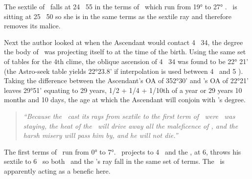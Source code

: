 The sextile of \Mars\, falls at 24 \Pisces\, 55 in the terms of \Mars\, which run from 19° to 27° \Pisces. \Venus\, is sitting at 25 \Pisces\, 50 so she is in the same terms as the sextile ray and therefore removes its malice.

Next the author looked at when the Ascendant would contact 4 \Taurus\, 34, the degree the body of \Saturn\, was projecting itself to at the time of the birth. Using the same set of tables for the 4th clime, the oblique ascension of 4 \Taurus\, 34 was found to be 22° 21' (the Astro-seek table yields 22°23.8' if interpolation is used between 4 \Taurus\, and 5 \Taurus). Taking the difference between the Ascendant's OA of 352°30' and \Saturn's OA of 22°21' leaves 29°51' equating to 29 years, 1/2 + 1/4 + 1/10th of a year or 29 years 10 months and 10 days, the age at which the Ascendant will conjoin with \Saturn's degree.

\begin{quote}
\textsl{``Because  the \Sun\, cast its rays from sextile to the first term of \Taurus\, were \Saturn\, was staying, the heat of the \Sun\, will drive away all the maleficence of \Saturn, and the harsh misery will pass him by, and he will not die.''}
\end{quote}

The first terms of \Taurus\, run from 0° to 7°. \Saturn\, projects to 4 \Taurus\, and the \Sun, at 6\Pisces, throws his sextile to 6 \Taurus\, so both \Saturn\, and the \Sun's ray fall in the same set of terms. The \Sun\, is apparently acting as a benefic here.